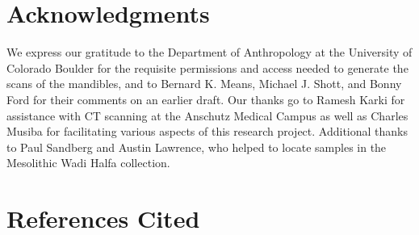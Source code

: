 \documentclass[review]{elsarticle}
\begin{document}
\section*{Acknowledgments}

We express our gratitude to the Department of Anthropology at the University of Colorado Boulder for the requisite permissions and access needed to generate the scans of the mandibles, and to Bernard K. Means, Michael J. Shott, and Bonny Ford for their comments on an earlier draft. Our thanks go to Ramesh Karki for assistance with CT scanning at the Anschutz Medical Campus as well as Charles Musiba for facilitating various aspects of this research project. Additional thanks to Paul Sandberg and Austin Lawrence, who helped to locate samples in the Mesolithic Wadi Halfa collection.

\section*{References Cited}


\end{document}
